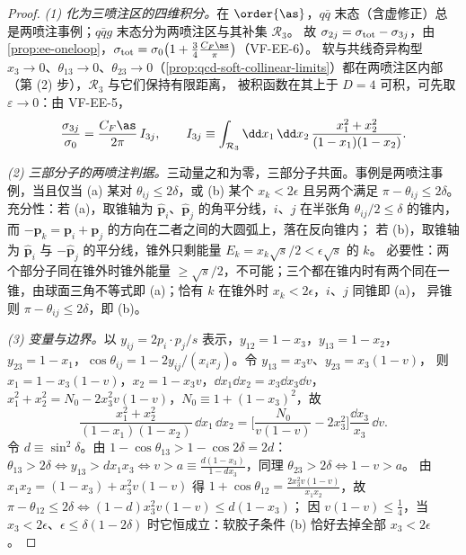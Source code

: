 \begin{proof}
\emph{(1) 化为三喷注区的四维积分。}在 $\order{\as}$，$q\bar q$ 末态（含虚修正）总是两喷注事例；$q\bar qg$ 末态分为两喷注区与其补集 $\mathcal R_3$。
故 $\sigma_{2j}=\sigma_{\rm tot}-\sigma_{3j}$，由\cref{prop:ee-oneloop}，$\sigma_{\rm tot}=\sigma_0\big(1+\frac34\frac{C_F\as}{\pi}\big)$（VF-EE-6）。%
软与共线奇异构型 $x_3\to0$、$\theta_{13}\to0$、$\theta_{23}\to0$（\cref{prop:qcd-soft-collinear-limits}）都在两喷注区内部（第 (2) 步），$\mathcal R_3$ 与它们保持有限距离，
被积函数在其上于 $D=4$ 可积，可先取 $\varepsilon\to0$：由 VF-EE-5，%
\begin{equation}\label{eq:jets-sigma3}
\frac{\sigma_{3j}}{\sigma_0}=\frac{C_F\as}{2\pi}\,I_{3j},\qquad
I_{3j}\equiv\int_{\mathcal R_3}\dd x_1\,\dd x_2\,\frac{x_1^2+x_2^2}{(1-x_1)(1-x_2)} .
\end{equation}

\emph{(2) 三部分子的两喷注判据。}三动量之和为零，三部分子共面。事例是两喷注事例，当且仅当
(a) 某对 $\theta_{ij}\le2\delta$，或 (b) 某个 $x_k<2\epsilon$ 且另两个满足 $\pi-\theta_{ij}\le2\delta$。
充分性：若 (a)，取锥轴为 $\hat{\bm p}_i$、$\hat{\bm p}_j$ 的角平分线，$i$、$j$ 在半张角 $\theta_{ij}/2\le\delta$ 的锥内，而 $-\bm p_k=\bm p_i+\bm p_j$ 的方向在二者之间的大圆弧上，落在反向锥内；
若 (b)，取锥轴为 $\hat{\bm p}_i$ 与 $-\hat{\bm p}_j$ 的平分线，锥外只剩能量 $E_k=x_k\sqrt s/2<\epsilon\sqrt s$ 的 $k$。
必要性：两个部分子同在锥外时锥外能量 $\ge\sqrt s/2$，不可能；三个都在锥内时有两个同在一锥，由球面三角不等式即 (a)；恰有 $k$ 在锥外时 $x_k<2\epsilon$，$i$、$j$ 同锥即 (a)，
异锥则 $\pi-\theta_{ij}\le2\delta$，即 (b)。

\emph{(3) 变量与边界。}以 $y_{ij}=2p_i\cdot p_j/s$ 表示，$y_{12}=1-x_3$，$y_{13}=1-x_2$，$y_{23}=1-x_1$，$\cos\theta_{ij}=1-2y_{ij}/(x_ix_j)$。令 $y_{13}=x_3v$、$y_{23}=x_3(1-v)$，
则 $x_1=1-x_3(1-v)$，$x_2=1-x_3v$，$\dd x_1\dd x_2=x_3\dd x_3\dd v$，$x_1^2+x_2^2=N_0-2x_3^2v(1-v)$，$N_0\equiv1+(1-x_3)^2$，故
\begin{equation}\label{eq:jets-measure}
\frac{x_1^2+x_2^2}{(1-x_1)(1-x_2)}\,\dd x_1\,\dd x_2=\Big[\frac{N_0}{v(1-v)}-2x_3^2\Big]\frac{\dd x_3}{x_3}\,\dd v .
\end{equation}
令 $d\equiv\sin^2\delta$。由 $1-\cos\theta_{13}>1-\cos2\delta=2d$：$\theta_{13}>2\delta\iff y_{13}>dx_1x_3\iff v>a\equiv\frac{d(1-x_3)}{1-dx_3}$，同理 $\theta_{23}>2\delta\iff1-v>a$。
由 $x_1x_2=(1-x_3)+x_3^2v(1-v)$ 得 $1+\cos\theta_{12}=\frac{2x_3^2v(1-v)}{x_1x_2}$，故 $\pi-\theta_{12}\le2\delta\iff(1-d)x_3^2v(1-v)\le d(1-x_3)$；
因 $v(1-v)\le\frac14$，当 $x_3<2\epsilon$、$\epsilon\le\delta(1-2\delta)$ 时它恒成立：软胶子条件 (b) 恰好去掉全部 $x_3<2\epsilon$。


\end{proof}
